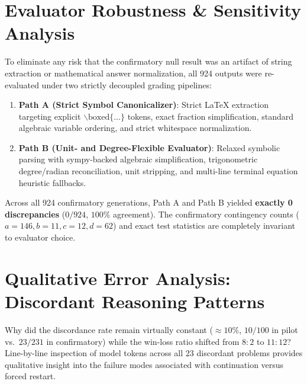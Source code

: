 \documentclass[11pt]{article}
\begin{document}
\section{Evaluator Robustness \& Sensitivity Analysis}
\label{sec:evaluator_sensitivity}

To eliminate any risk that the confirmatory null result was an artifact of string extraction or mathematical answer normalization, all 924 outputs were re-evaluated under two strictly decoupled grading pipelines:
\begin{enumerate}
    \item \textbf{Path A (Strict Symbol Canonicalizer)}: Strict LaTeX extraction targeting explicit $\backslash\text{boxed}\{\dots\}$ tokens, exact fraction simplification, standard algebraic variable ordering, and strict whitespace normalization.
    \item \textbf{Path B (Unit- and Degree-Flexible Evaluator)}: Relaxed symbolic parsing with sympy-backed algebraic simplification, trigonometric degree/radian reconciliation, unit stripping, and multi-line terminal equation heuristic fallbacks.
\end{enumerate}

Across all 924 confirmatory generations, Path A and Path B yielded \textbf{exactly 0 discrepancies} ($0/924$, $100\%$ agreement). The confirmatory contingency counts ($a=146, b=11, c=12, d=62$) and exact test statistics are completely invariant to evaluator choice.

\section{Qualitative Error Analysis: Discordant Reasoning Patterns}
\label{sec:mechanisms}

Why did the discordance rate remain virtually constant ($\approx 10\%$, $10/100$ in pilot vs.\ $23/231$ in confirmatory) while the win-loss ratio shifted from $8:2$ to $11:12$? Line-by-line inspection of model tokens across all $23$ discordant problems provides qualitative insight into the failure modes associated with continuation versus forced restart.
\end{document}
